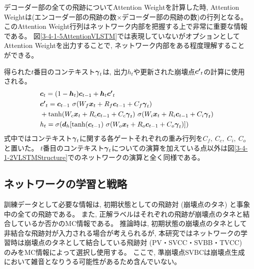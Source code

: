 デコーダー部の全ての飛跡についてAttention Weightを計算した時, Attention Weightは(エンコーダー部の飛跡の数$\times$デコーダー部の飛跡の数)の行列となる。
このAttention Weight行列はネットワーク内部を把握する上で非常に重要な情報である。
図\ref{3-4-1-5AttentionVLSTM}では表現していないがオプションとしてAttention Weightを出力することで, ネットワーク内部をある程度理解することができる。

得られた$t$番目のコンテキスト${\mbox{\boldmath{$\gamma$}}}_{t}$は, 出力$h_{t}$や更新された崩壊点${\mbox{\boldmath{$c'$}}}_{t}$の計算に使用される。
\begin{equation}
 \begin{split}
  &{\mbox{\boldmath{$c$}}}_{t} 
  = (1-{\mbox{\boldmath{$h$}}}_t) {\mbox{\boldmath{$c$}}}_{t-1} + {\mbox{\boldmath{$h$}}}_t {\mbox{\boldmath{$c'$}}}_{t}\\
  &{\mbox{\boldmath{$c'$}}}_{t}
  = {\mbox{\boldmath{$c$}}}_{t-1} \  \sigma (W_f {\mbox{\boldmath{$x$}}}_t + R_f {\mbox{\boldmath{$c$}}}_{t-1} + C_f {\mbox{\boldmath{$\gamma$}}}_{t})\\
  &+ \tanh (W_c {\mbox{\boldmath{$x$}}}_t + R_c {\mbox{\boldmath{$c$}}}_{t-1} + C_c {\mbox{\boldmath{$\gamma$}}}_{t}) \  \sigma (W_i {\mbox{\boldmath{$x$}}}_t + R_i {\mbox{\boldmath{$c$}}}_{t-1} + C_i {\mbox{\boldmath{$\gamma$}}}_{t})\\
  &h_{t} 
  = \sigma ({\mbox{\boldmath{$d$}}}_h [\tanh({\mbox{\boldmath{$c$}}}_{t-1}) \  \sigma (W_o {\mbox{\boldmath{$x$}}}_t + R_o {\mbox{\boldmath{$c$}}}_{t-1} + C_o {\mbox{\boldmath{$\gamma$}}}_{t}) ])
 \end{split}
\end{equation}
式中ではコンテキスト${\mbox{\boldmath{$\gamma$}}}_{t}$に関する各ゲートそれぞれの重み行列を$C_f,\ C_c,\ C_i,\ C_o$と置いた。
$t$番目のコンテキスト${\mbox{\boldmath{$\gamma$}}}_{t}$についての演算を加えている点以外は図\ref{3-4-1-2VLSTMStructure}でのネットワークの演算と全く同様である。

\newpage
\subsection{ネットワークの学習と戦略} \label{Net:VLSTM:TrainingandStrategyofVLSTM}

訓練データとして必要な情報は, 初期状態としての飛跡対 (崩壊点のタネ) と事象中の全ての飛跡である。
また, 正解ラベルはそれぞれの飛跡が崩壊点のタネと結合しているか否かのMC情報である。
推論時は, 初期状態の崩壊点のタネとして非結合な飛跡対が入力される場合が考えられるが, 本研究ではネットワークの学習時は崩壊点のタネとして結合している飛跡対 (PV・SVCC・SVBB・TVCC) のみをMC情報によって選択し使用する。
ここで, 準崩壊点SVBCは崩壊点生成において雑音となりうる可能性があるため含んでいない。

